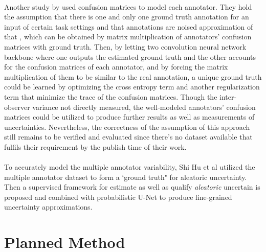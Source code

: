 \documentclass[12pt]{extarticle}
\begin{document}
\paragraph{}
Another study by \cite{zhang2020disentangling} used confusion matrices to
model each annotator. They hold the assumption that there is one and
only one ground truth annotation for an input of certain task settings and
that annotations are noised approximation of that
, which can be obtained by matrix multiplication of annotators' 
confusion matrices with ground truth. Then, by letting two convolution neural network backbone
where one outputs the estimated ground truth and the other accounts for the confusion matrices
of each annotator, and by forcing the matrix multiplication of them to be similar to the
real annotation, a unique ground truth could be learned by optimizing the cross entropy term
and another regularization term that minimize the trace of the confusion matrices.
Though the inter-observer variance not directly measured, the well-modeled annotators'
confusion matrices could be utilized to produce further results
as well as measurements of uncertainties.
Nevertheless, the correctness of the assumption of this approach
still remains to be verified and evaluated since there's no dataset available 
that fulfils their requirement by the publish time of their work.
\paragraph{}
To accurately model the multiple annotator variability, Shi Hu et al utilized the multiple annotator dataset
to form a `ground truth" for aleatoric uncertainty. Then a supervised framework for estimate
as well as qualify \textit{aleatoric} uncertain is proposed and combined with probabilistic U-Net
to produce fine-grained uncertainty approximations\cite{hu2019supervised}. 

\section{Planned Method}
\end{document}
